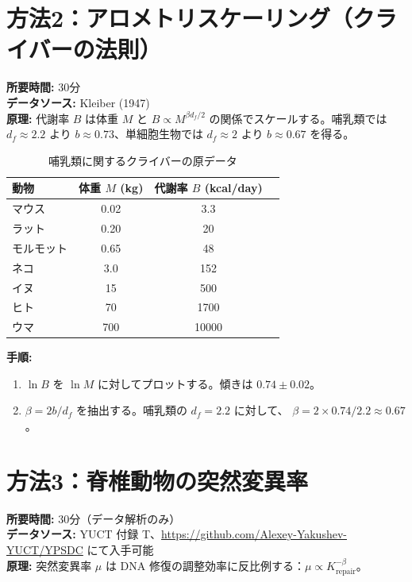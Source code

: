\documentclass[12pt,a4paper]{article}
\begin{document}
	\section{方法2：アロメトリスケーリング（クライバーの法則）}
	\label{sec:kleiber}
	
	\textbf{所要時間:} 30分\\
	\textbf{データソース:} Kleiber (1947) \cite{Kleiber1947}\\
	\textbf{原理:} 代謝率 \(B\) は体重 \(M\) と \(B \propto M^{\beta d_f/2}\) の関係でスケールする。哺乳類では \(d_f \approx 2.2\) より \(b \approx 0.73\)、単細胞生物では \(d_f \approx 2\) より \(b \approx 0.67\) を得る。
	
	\begin{table}[H]
		\centering
		\caption{哺乳類に関するクライバーの原データ}
		\label{tab:kleiber}
		\begin{tabular}{l c c c}
			\toprule
			動物 & 体重 \(M\) (kg) & 代謝率 \(B\) (kcal/day) \\
			\midrule
			マウス       & 0.02   & 3.3 \\
			ラット         & 0.20   & 20 \\
			モルモット  & 0.65   & 48 \\
			ネコ         & 3.0    & 152 \\
			イヌ         & 15     & 500 \\
			ヒト       & 70     & 1700 \\
			ウマ       & 700    & 10000 \\
			\bottomrule
		\end{tabular}
	\end{table}
	
	\textbf{手順:}
	\begin{enumerate}[label=(\arabic*)]
		\item \(\ln B\) を \(\ln M\) に対してプロットする。傾きは \(0.74 \pm 0.02\)。
		\item \(\beta = 2b / d_f\) を抽出する。哺乳類の \(d_f = 2.2\) に対して、
		\(\beta = 2 \times 0.74 / 2.2 \approx 0.67\)。
	\end{enumerate}
	
	\section{方法3：脊椎動物の突然変異率}
	\label{sec:mutation}
	
	\textbf{所要時間:} 30分（データ解析のみ）\\
	\textbf{データソース:} YUCT 付録 T、\url{https://github.com/Alexey-Yakushev-YUCT/YPSDC} にて入手可能\\
	\textbf{原理:} 突然変異率 \(\mu\) は DNA 修復の調整効率に反比例する：\(\mu \propto K_{\text{repair}}^{-\beta}\)。
	
\end{document}
